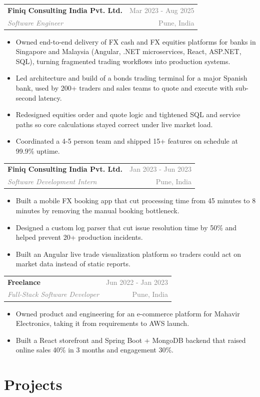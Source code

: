 \documentclass[10pt, letterpaper]{article}
\makeatletter
\newcommand{\resumeEntry}[4]{%
  \vspace{2pt}%
  \noindent
  \begin{tabularx}{\linewidth}{@{}X r@{}}
    \textbf{#1} & \textcolor{gray}{\small #2} \\[-1pt]
    \textit{\textcolor{gray}{\small #3}} & \textcolor{gray}{\small #4}
  \end{tabularx}%
}
\makeatother
\begin{document}
\resumeEntry{Finiq Consulting India Pvt. Ltd.}{Mar 2023 - Aug 2025}
  {Software Engineer}{Pune, India}
\begin{itemize}
  \item Owned end-to-end delivery of FX cash and FX equities platforms for banks in Singapore and Malaysia (Angular, .NET microservices, React, ASP.NET, SQL), turning fragmented trading workflows into production systems.
  \item Led architecture and build of a bonds trading terminal for a major Spanish bank, used by 200+ traders and sales teams to quote and execute with sub-second latency.
  \item Redesigned equities order and quote logic and tightened SQL and service paths so core calculations stayed correct under live market load.
  \item Coordinated a 4-5 person team and shipped 15+ features on schedule at 99.9\% uptime.
\end{itemize}

\resumeEntry{Finiq Consulting India Pvt. Ltd.}{Jan 2023 - Jun 2023}
  {Software Development Intern}{Pune, India}
\begin{itemize}
  \item Built a mobile FX booking app that cut processing time from 45 minutes to 8 minutes by removing the manual booking bottleneck.
  \item Designed a custom log parser that cut issue resolution time by 50\% and helped prevent 20+ production incidents.
  \item Built an Angular live trade visualization platform so traders could act on market data instead of static reports.
\end{itemize}

\resumeEntry{Freelance}{Jun 2022 - Jan 2023}
  {Full-Stack Software Developer}{Pune, India}
\begin{itemize}
  \item Owned product and engineering for an e-commerce platform for Mahavir Electronics, taking it from requirements to AWS launch.
  \item Built a React storefront and Spring Boot + MongoDB backend that raised online sales 40\% in 3 months and engagement 30\%.
\end{itemize}

\section{Projects}
\end{document}
